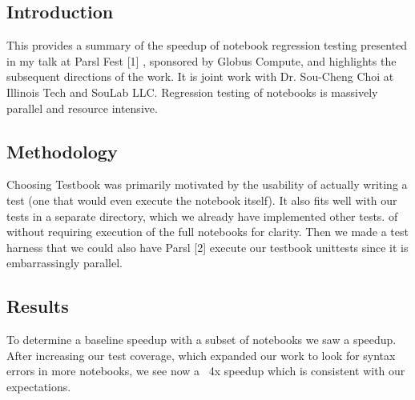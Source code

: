 \subsection{Introduction}


 This provides a summary of the speedup of notebook regression testing presented in my talk at Parsl Fest [1] , sponsored by Globus Compute, and highlights the subsequent directions of the work. It is joint work with Dr. Sou-Cheng Choi at Illinois Tech and SouLab LLC. Regression testing of notebooks is massively parallel and resource intensive.

\subsection{Methodology}
 Choosing Testbook was primarily motivated by the usability of actually writing a test (one that would even execute the notebook itself). It also fits well with our tests in a separate directory, which we already have implemented other tests. of without requiring execution of the full notebooks for clarity. Then we made a test harness that we could also have Parsl [2] execute our testbook unittests since it is embarrassingly parallel.

\subsection{Results}
To determine a baseline speedup with a subset of notebooks we saw a  speedup. 
After increasing our test coverage, which expanded our work to look for syntax errors in more notebooks, 
we see now a ~4x speedup which is consistent with our expectations. 

